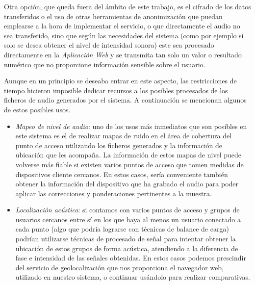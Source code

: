 Otra opción, que queda fuera del ámbito de este trabajo, es el cifrado de los datos transferidos o el uso de otras herramientas de anonimización que puedan emplearse a la hora de implementar el servicio, o que directamente el audio no sea transferido, sino que según las necesidades del sistema (como por ejemplo si solo se desea obtener el nivel de intensidad sonora) este sea procesado directamente en la \emph{Aplicación Web} y se transmita tan solo un valor o resultado numérico que no proporcione información sensible sobre el usuario.


Aunque en un principio se deseaba entrar en este aspecto, las restricciones de tiempo hicieron imposible dedicar recursos a los posibles procesados de los ficheros de audio generados por el sistema. A continuación se mencionan algunos de estos posibles usos.

\begin{itemize}
\item \emph{Mapeo de nivel de audio}: uno de los usos más inmediatos que son posibles en este sistema es el de realizar mapas de ruido en el área de cobertura del punto de acceso utilizando los ficheros generados y la información de ubicación que les acompaña. La información de estos mapas de nivel puede volverse más fiable si existen varios puntos de acceso que tomen medidas de dispositivos cliente cercanos. En estos casos, sería conveniente también obtener la información del dispositivo que ha grabado el audio para poder aplicar las correcciones y ponderaciones pertinentes a la muestra.
\item \emph{Localización acústica}: si contamos con varios puntos de acceso y grupos de usuarios cercanos entre sí en los que haya al menos un usuario conectado a cada punto (algo que podría lograrse con técnicas de balance de carga) podrían utilizarse técnicas de procesado de señal para intentar obtener la ubicación de estos grupos de forma acústica, atendiendo a la diferencia de fase e intensidad de las señales obtenidas. En estos casos podemos prescindir del servicio de geolocalización que nos proporciona el navegador web, utilizado en nuestro sistema, o continuar usándolo para realizar comparativas.
\end{itemize}


